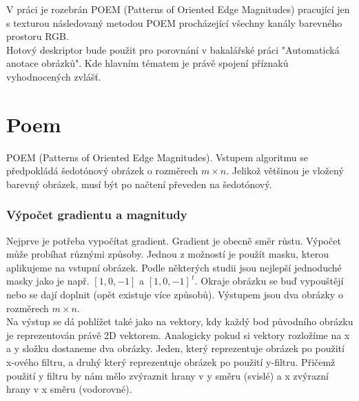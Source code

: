 \documentclass{report}
\begin{document}
V práci je rozebrán POEM (Patterns of Oriented Edge Magnitudes) pracující jen s texturou následovaný metodou POEM procházející všechny kanály barevného prostoru RGB. \\

Hotový deskriptor bude použit pro porovnání v bakalářské práci "Automatická anotace obrázků". Kde hlavním tématem je právě spojení příznaků vyhodnocených zvlášť. 

\chapter{Poem}
POEM (Patterns of Oriented Edge Magnitudes). Vstupem algoritmu se předpokládá šedotónový obrázek o rozměrech  $m \times n$. Jelikož většinou je vložený barevný obrázek, musí být po načtení převeden na šedotónový. \cite{SrovnaniDeskriptoru}

\subsection{Výpočet gradientu a magnitudy}
Nejprve je potřeba vypočítat gradient. Gradient je obecně směr růstu. Výpočet může probíhat různými způsoby. Jednou z možností je použít masku, kterou aplikujeme na vstupní obrázek. Podle některých studii jsou nejlepší jednoduché masky jako je např. $[1, 0, -1]$ a $[1, 0, -1]^{\,t}$. Okraje obrázku se buď vypouštějí nebo se dají doplnit (opět existuje více způsobů). Výstupem jsou dva obrázky o rozměrech $m \times n$. \\
Na výstup se dá pohlížet také jako na vektory, kdy každý bod původního obrázku je reprezentován právě 2D vektorem. Analogicky pokud si vektory rozložíme na x a y složku dostaneme dva obrázky. Jeden, který reprezentuje obrázek po použití x-ového filtru, a druhý který reprezentuje obrázek po použití y-filtru. Přičemž použití y filtru by nám mělo zvýraznit hrany v y směru (svislé) a x zvýrazní hrany v x směru (vodorovné). \\
\end{document}
